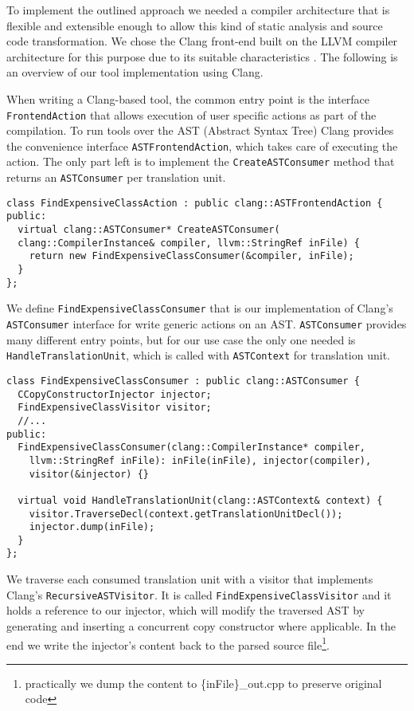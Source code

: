 \documentclass{article}
\begin{document}
To implement the outlined approach we needed a compiler architecture that is flexible and extensible enough to allow this kind of static analysis and source code transformation. We chose the Clang front-end built on the LLVM compiler architecture for this purpose due to its suitable characteristics \cite{lattner:clang}. The following is an overview of our tool implementation using Clang.

When writing a Clang-based tool, the common entry point is the interface \texttt{FrontendAction} that allows execution of user specific actions as part of the compilation. To run tools over the AST (Abstract Syntax Tree) Clang provides the convenience interface \texttt{ASTFrontendAction}, which takes care of executing the action. The only part left is to implement the \texttt{CreateASTConsumer} method that returns an \texttt{ASTConsumer} per translation unit.

\begin{verbatim}
class FindExpensiveClassAction : public clang::ASTFrontendAction {
public:
  virtual clang::ASTConsumer* CreateASTConsumer(
  clang::CompilerInstance& compiler, llvm::StringRef inFile) {
    return new FindExpensiveClassConsumer(&compiler, inFile);
  }
};
\end{verbatim}

We define \texttt{FindExpensiveClassConsumer} that is our implementation of Clang's \texttt{ASTConsumer} interface for write generic actions on an AST. \texttt{ASTConsumer} provides many different entry points, but for our use case the only one needed is \texttt{HandleTranslationUnit}, which is called with \texttt{ASTContext} for translation unit.

\begin{verbatim}
class FindExpensiveClassConsumer : public clang::ASTConsumer {
  CCopyConstructorInjector injector;
  FindExpensiveClassVisitor visitor;
  //...
public:
  FindExpensiveClassConsumer(clang::CompilerInstance* compiler,
  	llvm::StringRef inFile): inFile(inFile), injector(compiler),
  	visitor(&injector) {}
  
  virtual void HandleTranslationUnit(clang::ASTContext& context) {
    visitor.TraverseDecl(context.getTranslationUnitDecl());
    injector.dump(inFile);
  }
};
\end{verbatim}

We traverse each consumed translation unit with a visitor that implements Clang's \texttt{RecursiveASTVisitor}. It is called \texttt{FindExpensiveClassVisitor} and it holds a reference to our injector, which will modify the traversed AST by generating and inserting a concurrent copy constructor where applicable. In the end we write the injector's content back to the parsed source file\footnote{practically we dump the content to \{inFile\}\_out.cpp to preserve original code}.
\end{document}
